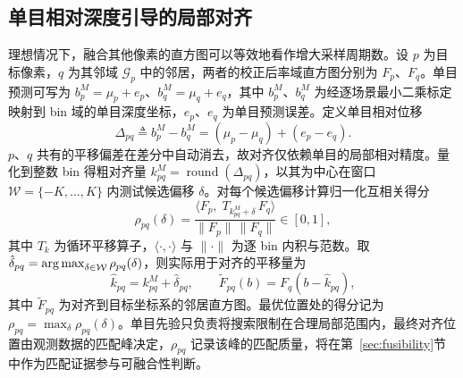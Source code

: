 \subsection{单目相对深度引导的局部对齐}
\label{sec:alignment}

理想情况下，融合其他像素的直方图可以等效地看作增大采样周期数。设 $p$ 为目标像素，$q$ 为其邻域 $\mathcal{G}_p$ 中的邻居，两者的校正后率域直方图分别为 $F_p$、$F_q$。单目预测可写为 $b_p^M=\mu_p+e_p$、$b_q^M=\mu_q+e_q$，其中 $b_p^M$、$b_q^M$ 为经逐场景最小二乘标定映射到 bin 域的单目深度坐标，$e_p$、$e_q$ 为单目预测误差。定义单目相对位移
\begin{equation}
  \Delta_{pq}\triangleq b_p^M-b_q^M=(\mu_p-\mu_q)+(e_p-e_q).
  \label{eq:delta}
\end{equation}
$p$、$q$ 共有的平移偏差在差分中自动消去，故对齐仅依赖单目的局部相对精度。量化到整数 bin 得粗对齐量 $k_{pq}^{M}=\operatorname{round}(\Delta_{pq})$，以其为中心在窗口 $\mathcal{W}=\{-K,\dots,K\}$ 内测试候选偏移 $\delta$。对每个候选偏移计算归一化互相关得分
\begin{equation}
  \rho_{pq}(\delta)
  =\frac{\big\langle F_p,\;T_{k_{pq}^{M}+\delta}\,F_q\big\rangle}
         {\big\|F_p\big\|\,\big\|F_q\big\|}\in[0,1],
  \label{eq:nmf}
\end{equation}
其中 $T_{k}$ 为循环平移算子，$\langle\cdot,\cdot\rangle$ 与 $\|\cdot\|$ 为逐 bin 内积与范数。取 $\hat\delta_{pq}=\operatorname*{arg\,max}_{\delta\in\mathcal{W}}\rho_{pq}(\delta)$，则实际用于对齐的平移量为
\begin{equation}
  \hat k_{pq}=k_{pq}^{M}+\hat\delta_{pq},
  \qquad
  \widetilde F_{pq}(b)=F_q(b-\hat k_{pq}),
  \label{eq:final_shift}
\end{equation}
其中 $\widetilde F_{pq}$ 为对齐到目标坐标系的邻居直方图。最优位置处的得分记为 $\rho_{pq}=\max_\delta\rho_{pq}(\delta)$。单目先验只负责将搜索限制在合理局部范围内，最终对齐位置由观测数据的匹配峰决定，$\rho_{pq}$ 记录该峰的匹配质量，将在第~\ref{sec:fusibility}节中作为匹配证据参与可融合性判断。
